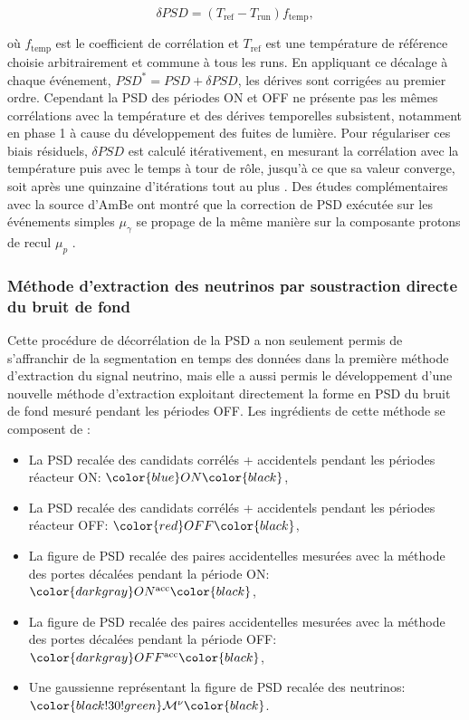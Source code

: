 \begin{equation}
    \delta PSD = (T_\textrm{ref} - T_\textrm{run}) f_\textrm{temp},
\end{equation}

\bigbreak

où $f_\textrm{temp}$ est le coefficient de corrélation et $T_\textrm{ref}$ est une température de référence choisie arbitrairement et commune à tous les runs. En appliquant ce décalage à chaque événement, $PSD^* = PSD + \delta PSD$, les dérives sont corrigées au premier ordre. Cependant la PSD des périodes ON et OFF ne présente pas les mêmes corrélations avec la température et des dérives temporelles subsistent, notamment en phase 1 à cause du développement des fuites de lumière. Pour régulariser ces biais résiduels, $\delta PSD$ est calculé itérativement, en mesurant la corrélation avec la température puis avec le temps à tour de rôle, jusqu'à ce que sa valeur converge, soit après une quinzaine d'itérations tout au plus \cite{docdb735}. Des études complémentaires avec la source d'AmBe ont montré que la correction de PSD exécutée sur les événements simples $\mu_\gamma$ se propage de la même manière sur la composante protons de recul $\mu_p$ \cite{docdb761}.\\

\subsubsection*{Méthode d'extraction des neutrinos par soustraction directe du bruit de fond}
\label{sec:laura_nu_extraction}

Cette procédure de décorrélation de la PSD a non seulement permis de s'affranchir de la segmentation en temps des données dans la première méthode d'extraction du signal neutrino, mais elle a aussi permis le développement d'une nouvelle méthode d'extraction exploitant directement la forme en PSD du bruit de fond mesuré pendant les périodes OFF. Les ingrédients de cette méthode se composent de :

\begin{itemize}[label=\textbullet]
    \item La PSD recalée des candidats corrélés + accidentels pendant les périodes réacteur ON: $\color{blue} ON \color{black}$,
    \item La PSD recalée des candidats corrélés + accidentels pendant les périodes réacteur OFF: $\color{red} OFF \color{black}$,
    \item La figure de PSD recalée des paires accidentelles mesurées avec la méthode des portes décalées pendant la période ON: $\color{darkgray} ON^\textrm{acc} \color{black}$,
    \item La figure de PSD recalée des paires accidentelles mesurées avec la méthode des portes décalées pendant la période OFF: $\color{darkgray} OFF^\textrm{acc} \color{black}$,
    \item Une gaussienne représentant la figure de PSD recalée des neutrinos: $\color{black!30!green} \mathcal{M}^\nu \color{black}$.
\end{itemize}


